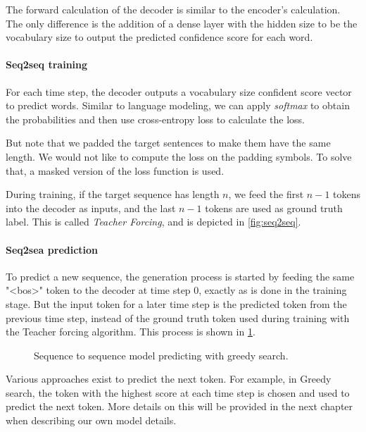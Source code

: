 The forward calculation of the decoder is similar to the encoder's calculation. The only difference is the addition of a dense layer with the hidden size to be the vocabulary size to output the predicted confidence score for each word.

\paragraph{Seq2seq training}

For each time step, the decoder outputs a vocabulary size confident score vector to predict words. Similar to language modeling, we can apply \textit{softmax} to obtain the probabilities and then use cross-entropy loss to calculate the loss. 

But note that we padded the target sentences to make them have the same length. We would not like to compute the loss on the padding symbols. To solve that, a masked version of the loss function is used.

During training, if the target sequence has length $n$, we feed the first $n-1$ tokens into the decoder as inputs, and the last $n-1$ tokens are used as ground truth label. This is called \textit{Teacher Forcing}, and is depicted in \cref{fig:seq2seq}.

\paragraph{Seq2sea prediction}

To predict a new sequence, the generation process is started by feeding the same "<bos>" token to the decoder at time step 0,  exactly as is done in the training stage. But the input token for a later time step is the predicted token from the previous time step, instead of the ground truth token used during training with the Teacher forcing algorithm. This process is shown in \cref{fig:seq2seq_predict}.

\begin{figure}[hpt]
    \centering
    
    \caption{Sequence to sequence model predicting with greedy search.}
    \label{fig:seq2seq_predict}
\end{figure}

Various approaches exist to predict the next token. For example, in Greedy search, the token with the highest score at each time step is chosen and used to predict the next token. More details on this will be provided in the next chapter when describing our own model details.

